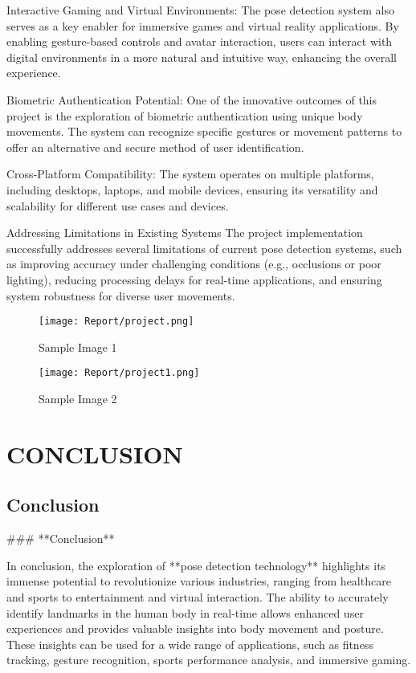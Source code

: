 \documentclass[a4paper,12pt]{report}
\begin{document}
Interactive Gaming and Virtual Environments: The pose detection system also serves as a key enabler for immersive games and virtual reality applications. By enabling gesture-based controls and avatar interaction, users can interact with digital environments in a more natural and intuitive way, enhancing the overall experience.

Biometric Authentication Potential: One of the innovative outcomes of this project is the exploration of biometric authentication using unique body movements. The system can recognize specific gestures or movement patterns to offer an alternative and secure method of user identification.

Cross-Platform Compatibility: The system operates on multiple platforms, including desktops, laptops, and mobile devices, ensuring its versatility and scalability for different use cases and devices.

Addressing Limitations in Existing Systems The project implementation successfully addresses several limitations of current pose detection systems, such as improving accuracy under challenging conditions (e.g., occlusions or poor lighting), reducing processing delays for real-time applications, and ensuring system robustness for diverse user movements.


\begin{figure}[h!]
    \centering
    \texttt{[image: Report/project.png]} %
    \caption{Sample Image 1}
    \label{fig:image1}
\end{figure}

\begin{figure}[h!]
    \centering
    \texttt{[image: Report/project1.png]} %
    \caption{Sample Image 2}
    \label{fig:image2}
    \end{figure}



\chapter{CONCLUSION}
\section*{Conclusion}
### **Conclusion**

In conclusion, the exploration of **pose detection technology** highlights its immense potential to revolutionize various industries, ranging from healthcare and sports to entertainment and virtual interaction. The ability to accurately identify landmarks in the human body in real-time allows enhanced user experiences and provides valuable insights into body movement and posture. These insights can be used for a wide range of applications, such as fitness tracking, gesture recognition, sports performance analysis, and immersive gaming.
\end{document}
